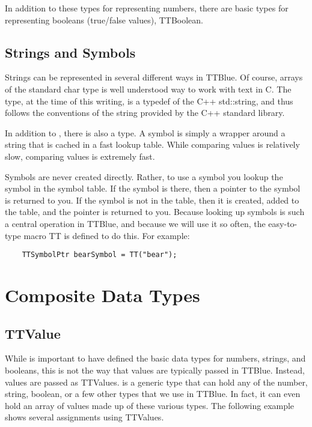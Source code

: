 In addition to these types for representing numbers, there are basic types for representing booleans (true/false values), TTBoolean.


\subsection{Strings and Symbols}

Strings can be represented in several different ways in TTBlue.  Of course, arrays of the standard char type is well understood way to work with text in C.  The  type, at the time of this writing, is a typedef of the C++ std::string, and thus follows the conventions of the string provided by the C++ standard library.

In addition to , there is also a  type.  A symbol is simply a wrapper around a string that is cached in a fast lookup table.  While comparing  values is relatively slow, comparing  values is extremely fast.

Symbols are never created directly.  Rather, to use a symbol you lookup the symbol in the symbol table.  If the symbol is there, then a pointer to the symbol is returned to you.  If the symbol is not in the table, then it is created, added to the table, and the pointer is returned to you.  Because looking up symbols is such a central operation in TTBlue, and because we will use it so often, the easy-to-type macro TT is defined to do this.  For example:

\begin{lstlisting}
	TTSymbolPtr bearSymbol = TT("bear");
\end{lstlisting}



\section{Composite Data Types}

\subsection{TTValue}

While is important to have defined the basic data types for numbers, strings, and booleans, this is not the way that values are typically passed in TTBlue.  Instead, values are passed as TTValues.  
 is a generic type that can hold any of the number, string, boolean, or a few other types that we use in TTBlue.  In fact, it can even hold an array of values made up of these various types.  The following example shows several assignments using TTValues.

